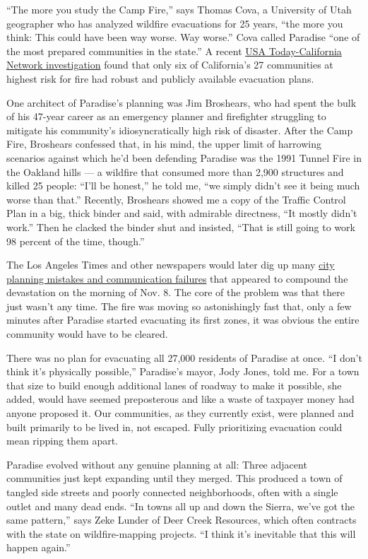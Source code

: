 ``The more you study the Camp Fire,'' says Thomas Cova, a University of
Utah geographer who has analyzed wildfire evacuations for 25 years,
``the more you think: This could have been way worse. Way worse.'' Cova
called Paradise ``one of the most prepared communities in the state.'' A
recent \href{https://apnews.com/6f621c1c54734d0b95d374556c2cf5c0}{USA
Today-California Network investigation} found that only six of
California's 27 communities at highest risk for fire had robust and
publicly available evacuation plans.

One architect of Paradise's planning was Jim Broshears, who had spent
the bulk of his 47-year career as an emergency planner and firefighter
struggling to mitigate his community's idiosyncratically high risk of
disaster. After the Camp Fire, Broshears confessed that, in his mind,
the upper limit of harrowing scenarios against which he'd been defending
Paradise was the 1991 Tunnel Fire in the Oakland hills --- a wildfire
that consumed more than 2,900 structures and killed 25 people: ``I'll be
honest,'' he told me, ``we simply didn't see it being much worse than
that.'' Recently, Broshears showed me a copy of the Traffic Control Plan
in a big, thick binder and said, with admirable directness, ``It mostly
didn't work.'' Then he clacked the binder shut and insisted, ``That is
still going to work 98 percent of the time, though.''

The Los Angeles Times and other newspapers would later dig up many
\href{https://www.latimes.com/local/lanow/la-me-paradise-fire-evacuation-system-20181120-story.html}{city
planning mistakes and communication failures} that appeared to compound
the devastation on the morning of Nov. 8. The core of the problem was
that there just wasn't any time. The fire was moving so astonishingly
fast that, only a few minutes after Paradise started evacuating its
first zones, it was obvious the entire community would have to be
cleared.

There was no plan for evacuating all 27,000 residents of Paradise at
once. ``I don't think it's physically possible,'' Paradise's mayor, Jody
Jones, told me. For a town that size to build enough additional lanes of
roadway to make it possible, she added, would have seemed preposterous
and like a waste of taxpayer money had anyone proposed it. Our
communities, as they currently exist, were planned and built primarily
to be lived in, not escaped. Fully prioritizing evacuation could mean
ripping them apart.

Paradise evolved without any genuine planning at all: Three adjacent
communities just kept expanding until they merged. This produced a town
of tangled side streets and poorly connected neighborhoods, often with a
single outlet and many dead ends. ``In towns all up and down the Sierra,
we've got the same pattern,'' says Zeke Lunder of Deer Creek Resources,
which often contracts with the state on wildfire-mapping projects. ``I
think it's inevitable that this will happen again.''

